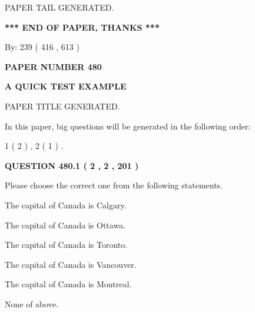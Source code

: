 \documentclass[12pt]{article}
\begin{document}
\vspace{2.0in} PAPER TAIL GENERATED.
   
   
   
   
\vspace{1.0in} 
{\textbf{\large{ *** END OF PAPER, THANKS *** }}} 
   
   
\hspace{1.0in} By: 
 239 ( 416 ,  613 )
   
   
   
   
\newpage 
\setcounter{page}{ 
   480001 } 
   
   
   
   
 {\textbf{ \Large{ PAPER NUMBER  480  }}}
   
   
\vspace{0.2in}
   
   
   
   
   
   
   
   
 \vspace{0.2in}
{\LARGE {\textbf{ A QUICK TEST EXAMPLE}}}
   
   
 PAPER TITLE GENERATED.
   
   
   
\vspace{0.2in}
   
In this paper, big questions will be generated in the following order: 
   
   
   1 ( 2 )
 ,
   2 ( 1 )
 .
  
\vspace{0.2in}
  
{\textbf{\Large{QUESTION
480.1 
 ( 2 , 2 , 201 )
}}}
  
  
Please choose the correct one from the following statements.
 
 
The capital of Canada is Calgary.
 
 
The capital of Canada is Ottawa.
 
 
The capital of Canada is Toronto.
 
 
The capital of Canada is Vancouver.
 
 
The capital of Canada is Montreal.
 
 
 None of above.
 
\end{document}
